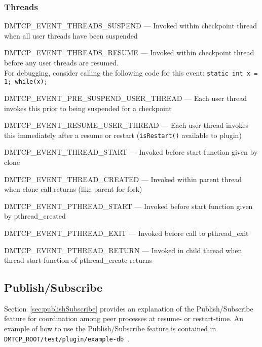\documentclass{article}
\begin{document}
\subsubsection*{Threads}
\begin{list}{}{\leftmargin=3em \itemindent=-2em}
\item
  DMTCP\_EVENT\_THREADS\_SUSPEND --- Invoked within checkpoint thread
	when all user threads have been suspended
\item
  DMTCP\_EVENT\_THREADS\_RESUME --- Invoked within checkpoint thread before
	any user threads are resumed. \\
	For debugging, consider calling the following code for this
        event:  {\tt static int x = 1; while(x);}
\item
  DMTCP\_EVENT\_PRE\_SUSPEND\_USER\_THREAD --- Each user thread invokes this prior
	to being suspended for a checkpoint
\item
  DMTCP\_EVENT\_RESUME\_USER\_THREAD --- Each user thread invokes this immediately
	after a resume or restart ({\tt isRestart()} available to plugin)
\item
  DMTCP\_EVENT\_THREAD\_START --- Invoked before start function given by clone
\item
  DMTCP\_EVENT\_THREAD\_CREATED --- Invoked within parent thread when clone call returns  (like parent for fork)
\item
  DMTCP\_EVENT\_PTHREAD\_START --- Invoked before start function given by pthread\_created
\item
  DMTCP\_EVENT\_PTHREAD\_EXIT --- Invoked before call to pthread\_exit
\item
  DMTCP\_EVENT\_PTHREAD\_RETURN --- Invoked in child thread when thread start function of pthread\_create returns
\item
\end{list}

\subsection{Publish/Subscribe}

Section~\ref{sec:publishSubscribe} provides an explanation of the
Publish/Subscribe feature for coordination among peer processes at resume-
or restart-time.  An example of how to use the Publish/Subscribe feature
is contained in {\tt DMTCP\_ROOT/test/plugin/example-db}~.
\end{document}
